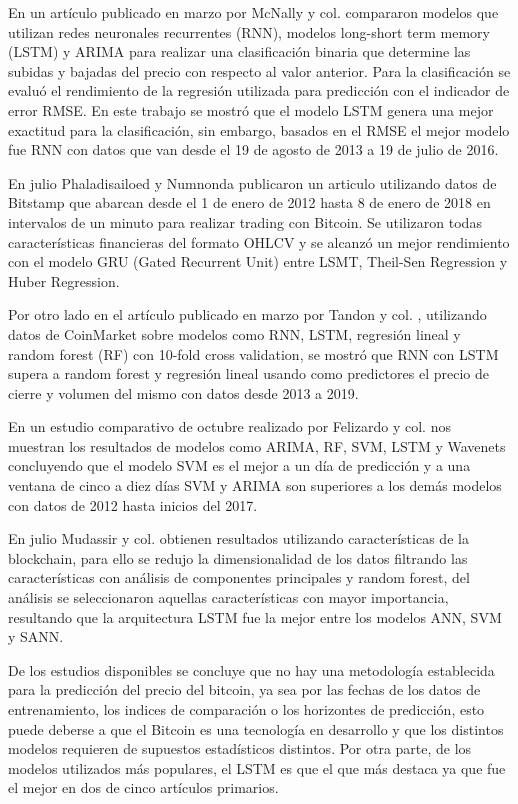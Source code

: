 En un artículo publicado en marzo por McNally y col. \parencite*{mcnallyPredictingPriceBitcoin2018} compararon modelos que utilizan redes neuronales recurrentes (RNN), modelos long-short term memory (LSTM) y ARIMA para realizar una clasificación binaria que determine las subidas y bajadas del precio con respecto al valor anterior. Para la clasificación se evaluó el rendimiento de la regresión utilizada para predicción con el indicador de error RMSE.
En este trabajo se mostró que el modelo LSTM genera una mejor exactitud para la clasificación, sin embargo, basados en el RMSE el mejor modelo fue RNN con datos que van desde el 19 de agosto de 2013 a 19 de julio de 2016. 

En julio Phaladisailoed y Numnonda \parencite*{phaladisailoedMachineLearningModels2018} publicaron un articulo utilizando datos de Bitstamp que abarcan desde el 1 de enero de 2012 hasta 8 de enero de 2018 en intervalos de un minuto para realizar trading con Bitcoin. Se utilizaron todas características financieras del formato OHLCV y se alcanzó un mejor rendimiento con el modelo GRU (Gated Recurrent Unit) entre LSMT, Theil-Sen Regression y Huber Regression. 


Por otro lado en el artículo publicado en marzo por Tandon y col. \parencite*{tandonBitcoinPriceForecasting2019}, utilizando datos de CoinMarket sobre modelos como RNN, LSTM, regresión lineal y random forest (RF) con 10-fold cross validation, se mostró que RNN con LSTM supera a random forest y regresión lineal usando como predictores el precio de cierre y volumen del mismo con datos desde 2013 a 2019.

En un estudio comparativo de octubre realizado por Felizardo y col. \parencite*{felizardoComparativeStudyBitcoin2019} nos muestran los resultados de modelos como ARIMA, RF, SVM, LSTM y Wavenets concluyendo que el modelo SVM es el mejor a un día de predicción y a una ventana de cinco a diez días SVM y ARIMA son superiores a los demás modelos con datos de 2012 hasta inicios del 2017.


En julio Mudassir y col. \parencite*{mudassirTimeseriesForecastingBitcoin2020} obtienen resultados utilizando características de la blockchain, para ello se redujo la dimensionalidad de los datos filtrando las características con análisis de componentes principales y random forest, del análisis se seleccionaron aquellas características con mayor importancia, resultando que la arquitectura LSTM fue la mejor entre los modelos ANN, SVM y SANN.

De los estudios disponibles se concluye que no hay una metodología establecida para la predicción del precio del bitcoin, ya sea por las fechas de los datos de entrenamiento, los indices de comparación o los horizontes de predicción, esto puede deberse a que el Bitcoin es una tecnología en desarrollo y que los distintos modelos requieren de supuestos estadísticos distintos. 
Por otra parte, de los modelos utilizados más populares, el LSTM es que el que más destaca ya que fue el mejor en dos de cinco artículos primarios.


